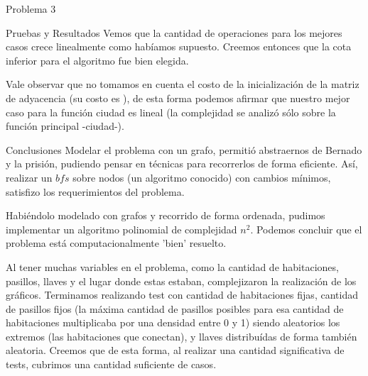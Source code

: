 \begin{section}{Problema 3}
\begin{subsection}{Pruebas y Resultados}
		Vemos que la cantidad de operaciones para los mejores casos crece linealmente como habíamos supuesto. Creemos entonces que la cota inferior para el algoritmo fue bien elegida.

		Vale observar que no tomamos en cuenta el costo de la inicialización de la matriz de adyacencia (su costo es ), de esta forma podemos afirmar que nuestro mejor caso para la función ciudad es lineal (la complejidad se analizó sólo sobre la función principal -ciudad-).

		
	\end{subsection}

	\begin{subsection}{Conclusiones}
		Modelar el problema con un grafo, permitió abstraernos de Bernado y la prisión, pudiendo pensar en técnicas para recorrerlos de forma eficiente. Así, realizar un $bfs$ sobre nodos (un algoritmo conocido) con cambios mínimos, satisfizo los requerimientos del problema.

		Habiéndolo modelado con grafos y recorrido de forma ordenada, pudimos implementar un algoritmo polinomial de complejidad $n^2$. Podemos concluir que el problema está computacionalmente 'bien' resuelto.

		Al tener muchas variables en el problema, como la cantidad de habitaciones, pasillos, llaves y el lugar donde estas estaban, complejizaron la realización de los gráficos. Terminamos realizando test con cantidad de habitaciones fijas, cantidad de pasillos fijos (la máxima cantidad de pasillos posibles para esa cantidad de habitaciones multiplicaba por una densidad entre 0 y 1) siendo aleatorios los extremos (las habitaciones que conectan), y llaves distribuídas de forma también aleatoria. Creemos que de esta forma, al realizar una cantidad significativa de tests, cubrimos una cantidad suficiente de casos.

	\end{subsection}
\end{section}


